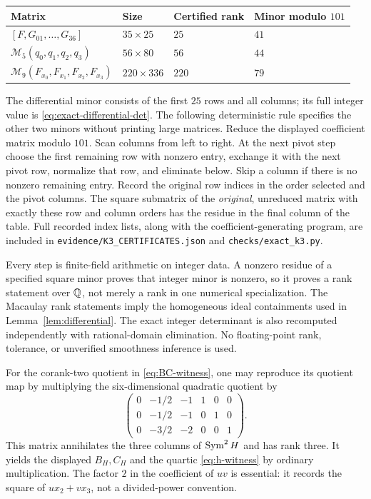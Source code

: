 \begin{center}
\begin{tabular}{llll}
\toprule
Matrix & Size & Certified rank & Minor modulo $101$\\
\midrule
$[F,G_{01},\ldots,G_{36}]$ & $35\times25$ & $25$ & $41$\\
$\mathcal M_5(q_0,q_1,q_2,q_3)$ & $56\times80$ & $56$ & $44$\\
$\mathcal M_9(F_{x_0},F_{x_1},F_{x_2},F_{x_3})$ & $220\times336$ & $220$ & $79$\\
\bottomrule
\end{tabular}
\end{center}
The differential minor consists of the first $25$ rows and all columns;
its full integer value is \eqref{eq:exact-differential-det}.
The following deterministic rule specifies the other two minors without
printing large matrices. Reduce the displayed coefficient matrix modulo
$101$. Scan columns from left to right. At the next pivot step choose
the first remaining row with nonzero entry, exchange it with the next
pivot row, normalize that row, and eliminate below. Skip a column if
there is no nonzero remaining entry. Record the original row indices
in the order selected and the pivot columns. The square submatrix of
the \emph{original}, unreduced matrix with exactly these row and column
orders has the residue in the final column of the table. Full recorded
index lists, along with the coefficient-generating program, are included
in \texttt{evidence/K3\_CERTIFICATES.json} and
\texttt{checks/exact\_k3.py}.

Every step is finite-field arithmetic on integer data. A nonzero
residue of a specified square minor proves that integer minor is nonzero,
so it proves a rank statement over $\mathbb Q$, not merely a rank in one
numerical specialization. The Macaulay rank statements imply the
homogeneous ideal containments used in Lemma~\ref{lem:differential}.
The exact integer determinant is also recomputed independently with
rational-domain elimination. No floating-point rank, tolerance, or
unverified smoothness inference is used.

For the corank-two quotient in \eqref{eq:BC-witness}, one may reproduce
its quotient map by multiplying the six-dimensional quadratic quotient
by
\[
 \begin{pmatrix}
 0&-1/2&-1&1&0&0\\
 0&-1/2&-1&0&1&0\\
 0&-3/2&-2&0&0&1
 \end{pmatrix}.
\]
This matrix annihilates the three columns of $\operatorname{Sym}^2H$ and has rank
three. It yields the displayed $B_H,C_H$ and the quartic
\eqref{eq:h-witness} by ordinary multiplication. The factor $2$ in
the coefficient of $uv$ is essential: it records the square of
$u x_2+v x_3$, not a divided-power convention.

